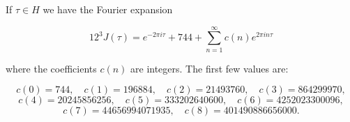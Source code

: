 If $\tau \in H$ we have the Fourier expansion

$$12^3 J(\tau) = e^{-2\pi i\tau} + 744 + \sum_{n=1}^{\infty} c(n) e^{2\pi i n\tau}$$

where the coefficients $c(n)$ are integers. The first few values are:

$$c(0) = 744, \quad c(1) = 196884, \quad c(2) = 21493760, \quad c(3) = 864299970,$$
$$c(4) = 20245856256, \quad c(5) = 333202640600, \quad c(6) = 4252023300096,$$
$$c(7) = 44656994071935, \quad c(8) = 401490886656000.$$
